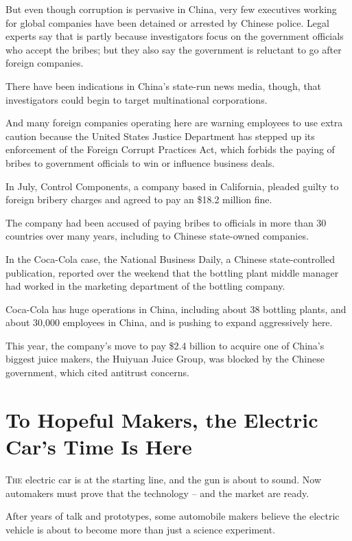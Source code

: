 ﻿\documentclass[12pt]{article}
\begin{document}
But even though corruption is pervasive in China, very few executives working for global companies
have been detained or arrested by Chinese police. Legal experts say that is partly because
investigators focus on the government officials who accept the bribes; but they also say the
government is reluctant to go after foreign companies.

There have been indications in China's state-run news media, though, that investigators could begin
to target multinational corporations.

And many foreign companies operating here are warning employees to use extra caution because the
United States Justice Department has stepped up its enforcement of the Foreign Corrupt Practices
Act, which forbids the paying of bribes to government officials to win or influence business deals.

In July, Control Components, a company based in California, pleaded guilty to foreign bribery
charges and agreed to pay an \$18.2 million fine.

The company had been accused of paying bribes to officials in more than 30 countries over many
years, including to Chinese state-owned companies.

In the Coca-Cola case, the National Business Daily, a Chinese state-controlled publication, reported
over the weekend that the bottling plant middle manager had worked in the marketing department of
the bottling company.

Coca-Cola has huge operations in China, including about 38 bottling plants, and about 30,000
employees in China, and is pushing to expand aggressively here.

This year, the company's move to pay \$2.4 billion to acquire one of China's biggest juice makers,
the Huiyuan Juice Group, was blocked by the Chinese government, which cited antitrust concerns.

\section{To Hopeful Makers, the Electric Car's Time Is Here}

\lettrine{T}{he} electric car is at the starting line, and the gun is about to sound. Now automakers
must prove that the technology -- and the market are ready.

After years of talk and prototypes, some automobile makers believe the electric vehicle is about to
become more than just a science experiment.
\end{document}
